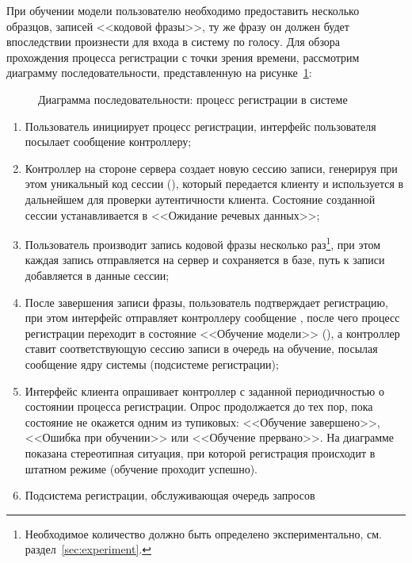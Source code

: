 При обучении модели пользователю необходимо предоставить несколько образцов,
записей <<кодовой фразы>>, ту же фразу он должен будет впоследствии произнести
для входа в систему по голосу. Для обзора прохождения процесса регистрации с
точки зрения времени, рассмотрим диаграмму последовательности, представленную на
рисунке~\ref{fig:seq_enrollment}:

\begin{figure}[hp!]
    \center{
        \fontsize{12}{14}\selectfont
        
    }
    \caption{Диаграмма последовательности: процесс регистрации в системе}
    \label{fig:seq_enrollment}
\end{figure}

\begin{enumerate}
\item Пользователь инициирует процесс регистрации, интерфейс пользователя
посылает сообщение  контроллеру;
\item Контроллер на стороне сервера создает новую сессию записи, генерируя при
этом уникальный код сессии (), который передается клиенту и
используется в дальнейшем для проверки аутентичности клиента. Состояние
созданной сессии устанавливается в <<Ожидание речевых данных>>;
\item Пользователь производит запись кодовой фразы несколько
раз\footnote{Необходимое количество должно быть определено экспериментально, см.
раздел~\ref{sec:experiment}.}, при этом каждая запись отправляется на сервер и
сохраняется в базе, путь к записи добавляется в данные сессии;
\item После завершения записи фразы, пользователь подтверждает регистрацию, при
этом интерфейс отправляет контроллеру сообщение , после чего
процесс регистрации переходит в состояние <<Обучение модели>> (),
а контроллер ставит соответствующую сессию записи в очередь на обучение, посылая
сообщение  ядру системы (подсистеме регистрации);
\item Интерфейс клиента опрашивает контроллер с заданной периодичностью о
состоянии процесса регистрации. Опрос продолжается до тех пор, пока состояние не
окажется одним из тупиковых: <<Обучение завершено>>, <<Ошибка при обучении>> или
<<Обучение прервано>>. На диаграмме показана стереотипная ситуация, при которой
регистрация происходит в штатном режиме (обучение проходит успешно).
\item \label{enum:enroll} Подсистема регистрации, обслуживающая очередь запросов

\end{enumerate}
